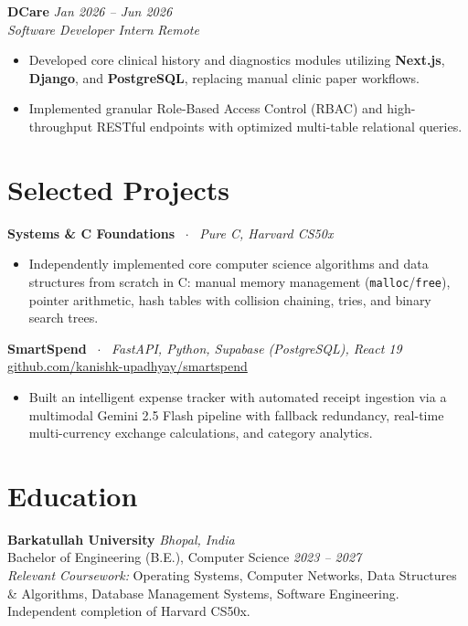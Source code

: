 \documentclass[10pt,a4paper]{article}
\begin{document}
\textbf{DCare} \hfill \textit{Jan 2026 -- Jun 2026} \\
\textit{Software Developer Intern} \hfill \textit{Remote}
\begin{itemize}
    \item Developed core clinical history and diagnostics modules utilizing \textbf{Next.js}, \textbf{Django}, and \textbf{PostgreSQL}, replacing manual clinic paper workflows.
    \item Implemented granular Role-Based Access Control (RBAC) and high-throughput RESTful endpoints with optimized multi-table relational queries.
\end{itemize}

\section{Selected Projects}
\textbf{Systems \& C Foundations} \ $\cdot$ \ \textit{Pure C, Harvard CS50x}
\begin{itemize}
    \item Independently implemented core computer science algorithms and data structures from scratch in C: manual memory management (\texttt{malloc}/\texttt{free}), pointer arithmetic, hash tables with collision chaining, tries, and binary search trees.
\end{itemize}

\textbf{SmartSpend} \ $\cdot$ \ \textit{FastAPI, Python, Supabase (PostgreSQL), React 19} \hfill \href{https://github.com/kanishk-upadhyay/smartspend}{github.com/kanishk-upadhyay/smartspend}
\begin{itemize}
    \item Built an intelligent expense tracker with automated receipt ingestion via a multimodal Gemini 2.5 Flash pipeline with fallback redundancy, real-time multi-currency exchange calculations, and category analytics.
\end{itemize}

\section{Education}
\textbf{Barkatullah University} \hfill \textit{Bhopal, India} \\
Bachelor of Engineering (B.E.), Computer Science \hfill \textit{2023 -- 2027} \\
\textit{Relevant Coursework:} Operating Systems, Computer Networks, Data Structures \& Algorithms, Database Management Systems, Software Engineering. Independent completion of Harvard CS50x.
\end{document}
